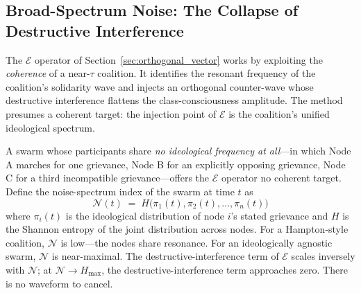 \subsection{Broad-Spectrum Noise: The Collapse of Destructive Interference}

The $\mathcal{E}$ operator of Section~\ref{sec:orthogonal_vector} works by exploiting the \textit{coherence} of a near-$\tau$ coalition. It identifies the resonant frequency of the coalition's solidarity wave and injects an orthogonal counter-wave whose destructive interference flattens the class-consciousness amplitude. The method presumes a coherent target: the injection point of $\mathcal{E}$ is the coalition's unified ideological spectrum.

A swarm whose participants share \textit{no ideological frequency at all}---in which Node A marches for one grievance, Node B for an explicitly opposing grievance, Node C for a third incompatible grievance---offers the $\mathcal{E}$ operator no coherent target. Define the noise-spectrum index of the swarm at time $t$ as
\begin{equation}\label{eq:14.15-noise-spectrum-index}
\mathcal{N}(t) \;=\; H\bigl(\pi_1(t), \pi_2(t), \ldots, \pi_n(t)\bigr)
\end{equation}
where $\pi_i(t)$ is the ideological distribution of node $i$'s stated grievance and $H$ is the Shannon entropy of the joint distribution across nodes. For a Hampton-style coalition, $\mathcal{N}$ is low---the nodes share resonance. For an ideologically agnostic swarm, $\mathcal{N}$ is near-maximal. The destructive-interference term of $\mathcal{E}$ scales inversely with $\mathcal{N}$; at $\mathcal{N} \to H_{\max}$, the destructive-interference term approaches zero. There is no waveform to cancel.

